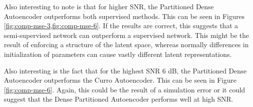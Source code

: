 Also interesting to note is that for higher SNR, the Partitioned Dense Autoencoder outperforms both supervised methods. This can be seen in Figures \cref{fig:comp-mse-3,fig:comp-mse-6}. If the results are correct, this suggests that a semi-supervised network can outperform a supervised network. This might be the result of enforcing a structure of the latent space, whereas normally differences in initialization of parameters can cause vastly different latent representations.

Also interesting is the fact that for the highest SNR 6 dB, the Partitioned Dense Autoencoder outperforms the Curro Autoencoder. This can be seen in Figure \ref{fig:comp-mse-6}. Again, this could be the result of a simulation error or it could suggest that the Dense Partitioned Autoencoder performs well at high SNR.

